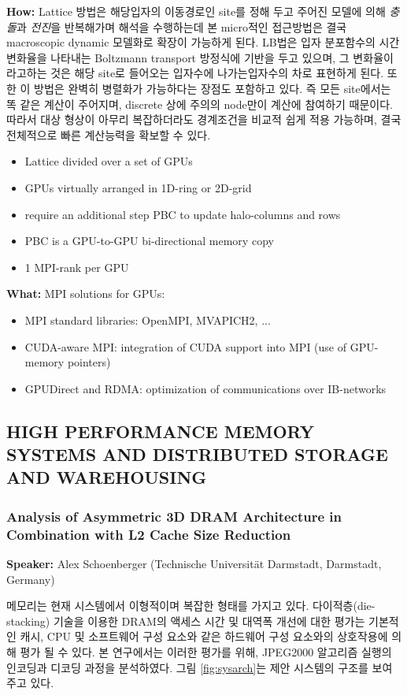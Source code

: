 \documentclass[twocolumn]{article}
\newcommand{\bi}{\begin{itemize}}
\newcommand{\ei}{\end{itemize}}
\newcommand{\ii}{\item}
\begin{document}
\noindent
\textbf{How:}  
Lattice 방법은 해당입자의 이동경로인 site를 정해 두고 주어진 모델에 의해 \textit{충돌}과 \textit{전진}을 반복해가며 해석을 수행하는데 본 micro적인 접근방법은 결국 macroscopic dynamic 모델화로 확장이 가능하게 된다. 
LB법은 입자 분포함수의 시간변화율을 나타내는 Boltzmann transport 방정식에 기반을 두고 있으며, 그 변화율이라고하는 것은 해당 site로 들어오는 입자수에 나가는입자수의 차로 표현하게 된다. 또한 이 방법은 완벽히 병렬화가 가능하다는 장점도 포함하고 있다. 
즉 모든 site에서는 똑 같은 계산이 주어지며, discrete 상에 주의의 node만이 계산에 참여하기 때문이다. 
따라서 대상 형상이 아무리 복잡하더라도 경계조건을 비교적 쉽게 적용 가능하며, 결국 전체적으로 빠른 계산능력을 확보할 수 있다.
\bi
\ii Lattice divided over a set of GPUs
\ii GPUs virtually arranged in 1D-ring or 2D-grid
\ii require an additional step PBC to update halo-columns and rows
\ii  PBC is a GPU-to-GPU bi-directional memory copy
\ii 1 MPI-rank per GPU
\ei

\noindent
\textbf{What:}  
MPI solutions for GPUs:
\bi
\ii MPI standard libraries: OpenMPI, MVAPICH2, ...
\ii CUDA-aware MPI: integration of CUDA support into MPI (use of GPU-memory pointers)
\ii GPUDirect and RDMA: optimization of communications over IB-networks
\ei

\subsection{HIGH PERFORMANCE MEMORY SYSTEMS AND DISTRIBUTED STORAGE AND WAREHOUSING}
\subsubsection{Analysis of Asymmetric 3D DRAM Architecture in Combination with L2 Cache Size Reduction}
\textbf{Speaker:} Alex Schoenberger (Technische Universität Darmstadt, Darmstadt, Germany)

메모리는 현재 시스템에서 이형적이며 복잡한 형태를 가지고 있다.
다이적층(die-stacking) 기술을 이용한 DRAM의 액세스 시간 및 대역폭 개선에 대한 평가는  기본적인 캐시, CPU 및 소프트웨어 구성 요소와 같은 하드웨어 구성 요소와의 상호작용에 의해 평가 될 수 있다. 본 연구에서는 이러한 평가를 위해, JPEG2000 알고리즘 실행의 인코딩과 디코딩 과정을 분석하였다. 그림 \ref{fig:sysarch}는 제안 시스템의 구조를 보여 주고 있다.
\end{document}
